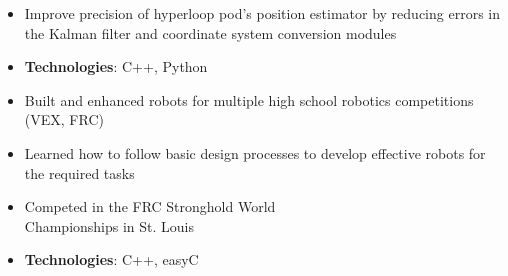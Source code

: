 \documentclass[10pt, letterpaper, ragged2e, withhyper]{altacv}
\begin{document}
\begin{paracol}{2}
    \divider
    
    \begin{itemize}
        \item Improve precision of hyperloop pod's position estimator by reducing errors in the Kalman filter and 
        coordinate system conversion modules
        \item \textbf{Technologies}: C++, Python 
    \end{itemize}

    \divider

    \begin{itemize}
        \item Built and enhanced robots for multiple high school robotics competitions (VEX, FRC)
        \item Learned how to follow basic design processes to develop effective robots for the required tasks
        \item Competed in the FRC Stronghold World\\ Championships in St. Louis 
        \item \textbf{Technologies}: C++, easyC 
    \end{itemize}
     


\end{paracol}
\end{document}
